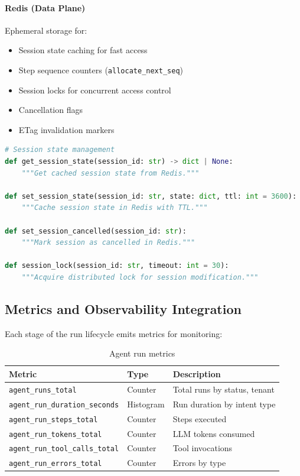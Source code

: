 \paragraph{Redis (Data Plane)} Ephemeral storage for:
\begin{itemize}
    \item Session state caching for fast access
    \item Step sequence counters (\texttt{allocate\_next\_seq})
    \item Session locks for concurrent access control
    \item Cancellation flags
    \item ETag invalidation markers
\end{itemize}

\begin{lstlisting}[language=Python, caption={Redis session state functions}, label=lst:redis-session]
# Session state management
def get_session_state(session_id: str) -> dict | None:
    """Get cached session state from Redis."""
    
def set_session_state(session_id: str, state: dict, ttl: int = 3600):
    """Cache session state in Redis with TTL."""
    
def set_session_cancelled(session_id: str):
    """Mark session as cancelled in Redis."""
    
def session_lock(session_id: str, timeout: int = 30):
    """Acquire distributed lock for session modification."""
\end{lstlisting}

\subsection{Metrics and Observability Integration}

Each stage of the run lifecycle emits metrics for monitoring:

\begin{table}[htbp]
\centering
\caption{Agent run metrics}
\label{tab:run-metrics}
\begin{tabular}{lll}
\hline
\textbf{Metric} & \textbf{Type} & \textbf{Description} \\
\hline
\texttt{agent\_runs\_total} & Counter & Total runs by status, tenant \\
\texttt{agent\_run\_duration\_seconds} & Histogram & Run duration by intent type \\
\texttt{agent\_run\_steps\_total} & Counter & Steps executed \\
\texttt{agent\_run\_tokens\_total} & Counter & LLM tokens consumed \\
\texttt{agent\_run\_tool\_calls\_total} & Counter & Tool invocations \\
\texttt{agent\_run\_errors\_total} & Counter & Errors by type \\
\hline
\end{tabular}
\end{table}

